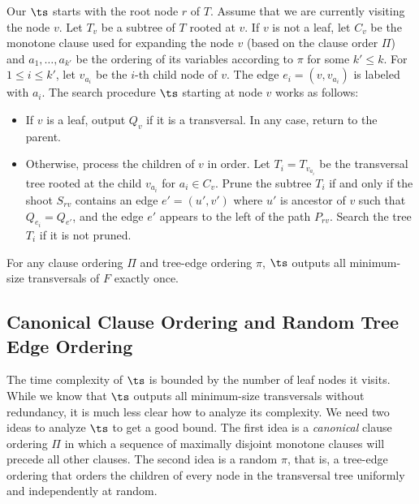 Our $\ts$ starts with the root node $r$ of $T$.
Assume that we are currently visiting the node $v$.
Let $T_v$ be a subtree of $T$ rooted at $v$.
If $v$ is not a leaf, let $C_v$ be the monotone clause used for expanding
the node $v$ (based on the clause order $\Pi$) and   $a_1, \ldots, a_{k'}$ be the ordering of its variables
according to $\pi$ for some $k' \le k$. For $1\leq i \leq k'$, 
let $v_{a_i}$ be the $i$-th child node of $v$. The edge $e_i=(v,v_{a_i})$ is labeled with $a_i$.
The search procedure $\ts$ starting at node $v$ works as follows:

\begin{itemize}
\item  If $v$ is a leaf,
output $Q_v$ if it is a transversal.
In any case, return to the parent.
\item Otherwise, process the children of $v$ in order. 
Let $T_{i} = T_{v_{a_i}}$ be the transversal tree 
rooted at the child $v_{a_i}$ for $a_i \in C_v$. 
Prune the subtree $T_i$ if and only if 
the shoot $S_{rv}$ contains an edge $e'=(u',v')$ 
where $u'$ is ancestor of $v$ such that $Q_{e_i} = Q_{e'}$, and
the edge $e'$ appears to the left of the path $P_{rv}$.
Search the tree $T_i$ if it is not pruned.

\end{itemize}

\begin{fact}
For any clause ordering $\Pi$
and tree-edge ordering $\pi$, 
$\ts$ outputs all minimum-size transversals of $F$ exactly once.
\end{fact}

\noindent
\subsection{Canonical Clause Ordering and Random Tree Edge Ordering}

The time complexity of $\ts$ is bounded by the number of leaf nodes it visits.
While we know that $\ts$ outputs 
all minimum-size transversals without redundancy, 
it is much less clear how to analyze its complexity.
We need two ideas to analyze $\ts$ to get a good bound.
The first idea is a \emph{canonical} clause ordering  $\Pi$
in which a sequence of  maximally disjoint
monotone clauses will precede all other clauses.
The second idea is a random $\pi$, that is, 
a tree-edge ordering that orders 
the children of every node in the transversal tree
uniformly 
and independently at random.

